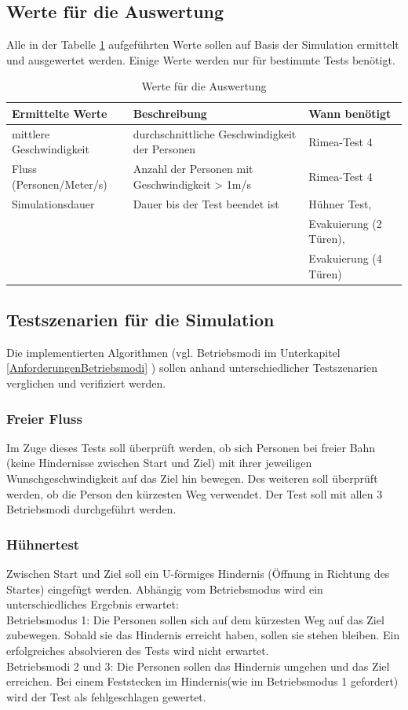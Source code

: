 \subsection{Werte für die Auswertung}
Alle in der Tabelle \ref{tab:WerteAuswertung} aufgeführten Werte sollen auf Basis der Simulation ermittelt und ausgewertet werden. Einige Werte werden nur für bestimmte Tests benötigt.
\begin{table}[htpb]
	\centering
	\begin{tabular}{lll}
		Ermittelte Werte & Beschreibung & Wann benötigt\\ \hline
		mittlere Geschwindigkeit & durchschnittliche Geschwindigkeit der Personen & Rimea-Test 4 \\	
		Fluss (Personen/Meter/s) & Anzahl der Personen mit Geschwindigkeit > 1m/s & Rimea-Test 4\\
		Simulationsdauer & Dauer bis der Test beendet ist & Hühner Test, \\&& Evakuierung (2 Türen), \\&& Evakuierung (4 Türen)\\
	\end{tabular}
	\caption{Werte für die Auswertung}
	\label{tab:WerteAuswertung}
\end{table}

\subsection{Testszenarien für die Simulation}
\label{AnforderungenTest}

Die implementierten Algorithmen (vgl. Betriebsmodi im Unterkapitel \ref{AnforderungenBetriebsmodi} ) sollen anhand unterschiedlicher Testszenarien verglichen und verifiziert werden. 
 
\subsubsection{Freier Fluss}
Im Zuge dieses Tests soll überprüft werden, ob sich Personen bei freier Bahn (keine Hindernisse zwischen Start und Ziel) mit ihrer jeweiligen Wunschgeschwindigkeit auf das Ziel hin bewegen. Des weiteren soll überprüft werden, ob die Person den kürzesten Weg verwendet. Der Test soll mit allen 3 Betriebsmodi durchgeführt werden.

\subsubsection{Hühnertest}
Zwischen Start und Ziel soll ein U-förmiges Hindernis (Öffnung in Richtung des Startes) eingefügt werden. Abhängig vom Betriebsmodus wird ein unterschiedliches Ergebnis erwartet:\\
Betriebsmodus 1: Die Personen sollen sich auf dem kürzesten Weg auf das Ziel zubewegen. Sobald sie das Hindernis erreicht haben, sollen sie stehen bleiben. Ein erfolgreiches absolvieren des Tests wird nicht erwartet. \\
Betriebsmodi 2 und 3: Die Personen sollen das Hindernis umgehen und das Ziel erreichen. Bei einem \glqq Feststecken im Hindernis\grqq (wie im Betriebsmodus 1 gefordert) wird der Test als fehlgeschlagen gewertet.
 
